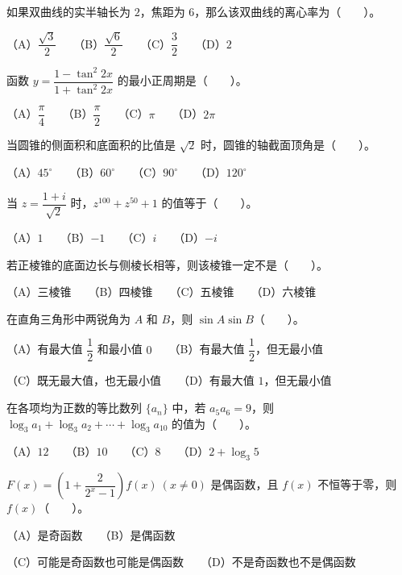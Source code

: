 \begin{question}
如果双曲线的实半轴长为 $2$，焦距为 $6$，那么该双曲线的离心率为\mbox{（　　）}。

（A）$\dfrac{\sqrt3}{2}$　　（B）$\dfrac{\sqrt6}{2}$　　（C）$\dfrac32$　　（D）$2$

\end{question}
\begin{question}
函数 $y=\dfrac{1-\tan^2 2x}{1+\tan^2 2x}$ 的最小正周期是\mbox{（　　）}。

（A）$\dfrac\pi4$　　（B）$\dfrac\pi2$　　（C）$\pi$　　（D）$2\pi$

\end{question}
\begin{question}
当圆锥的侧面积和底面积的比值是 $\sqrt2$ 时，圆锥的轴截面顶角是\mbox{（　　）}。

（A）$45^\circ$　　（B）$60^\circ$　　（C）$90^\circ$　　（D）$120^\circ$

\end{question}
\begin{question}
当 $z=\dfrac{1+i}{\sqrt2}$ 时，$z^{100}+z^{50}+1$ 的值等于\mbox{（　　）}。

（A）$1$　　（B）$-1$　　（C）$i$　　（D）$-i$

\end{question}
\begin{question}
若正棱锥的底面边长与侧棱长相等，则该棱锥一定不是\mbox{（　　）}。

（A）三棱锥　　（B）四棱锥　　（C）五棱锥　　（D）六棱锥

\end{question}
\begin{question}
在直角三角形中两锐角为 $A$ 和 $B$，则 $\sin A\sin B$\mbox{（　　）}。

（A）有最大值 $\dfrac12$ 和最小值 $0$　　（B）有最大值 $\dfrac12$，但无最小值

（C）既无最大值，也无最小值　　（D）有最大值 $1$，但无最小值

\end{question}
\begin{question}
在各项均为正数的等比数列 $\{a_n\}$ 中，若 $a_5a_6=9$，则 $\log_3 a_1+\log_3 a_2+\cdots+\log_3 a_{10}$ 的值为\mbox{（　　）}。

（A）$12$　　（B）$10$　　（C）$8$　　（D）$2+\log_3 5$

\end{question}
\begin{question}
$F(x)=\left(1+\dfrac{2}{2^x-1}\right)f(x)\ (x\ne0)$ 是偶函数，且 $f(x)$ 不恒等于零，则 $f(x)$\mbox{（　　）}。

（A）是奇函数　　（B）是偶函数

（C）可能是奇函数也可能是偶函数　　（D）不是奇函数也不是偶函数

\end{question}
